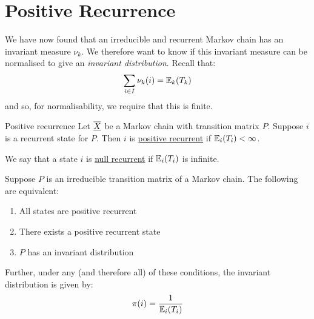 \documentclass[../Main.tex]{subfiles}
\begin{document}
\section{Positive Recurrence}
We have now found that an irreducible and recurrent Markov chain has an invariant measure $\nu_k$. We therefore want to know if this invariant measure can be normalised to give an \textit{invariant distribution}. Recall that:
\begin{equation*}
    \sum_{i \in I} \nu_k(i) = \mathbb{E}_k(T_k)
\end{equation*}
and so, for normalisability, we require that this is finite.
\begin{definition}{Positive recurrence}
    Let $\underline{\overline{X}}$ be a Markov chain with transition matrix $P$. Suppose $i$ is a recurrent state for $P$. Then $i$ is \underline{positive recurrent} if $\mathbb{E}_i(T_i) < \infty$.

    We say that a state $i$ is \underline{null recurrent} if $\mathbb{E}_i(T_i)$ is infinite.
\end{definition}
\begin{theorem}
    Suppose $P$ is an irreducible transition matrix of a Markov chain. The following are equivalent:
    \begin{enumerate}
        \item All states are positive recurrent
        \item There exists a positive recurrent state
        \item $P$ has an invariant distribution
    \end{enumerate}
    Further, under any (and therefore all) of these conditions, the invariant distribution is given by:
    \begin{equation*}
        \pi(i) = \frac{1}{\mathbb{E}_i(T_i)}
    \end{equation*}
    \label{thmPosRecurEquivs}
\end{theorem}
\end{document}
